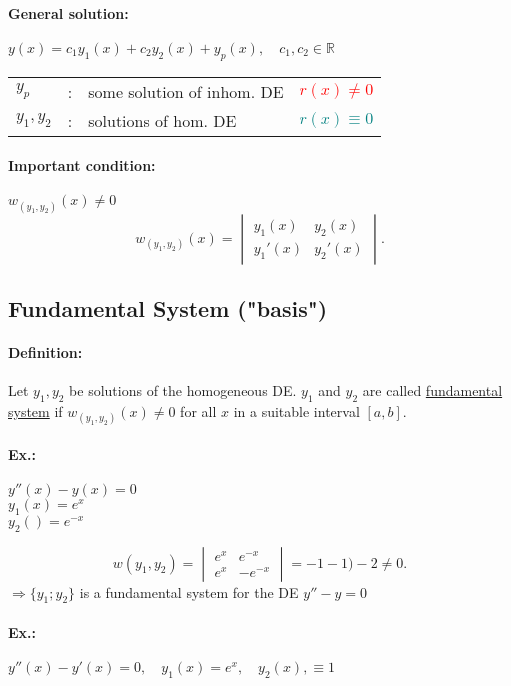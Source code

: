 \documentclass[]{article}
\begin{document}
\paragraph{General solution:} $y(x)=c_1y_1(x)+c_2y_2(x)+y_p(x),\quad c_1,c_2\in \mathbb R$\\
\begin{tabular}{l c l l}
	$y_p$ & : & some solution of inhom. DE & \textcolor{red}{$r(x)\not=0$}\\
	$y_1,y_2$ & : &solutions of hom. DE & \textcolor{teal}{$r(x)\equiv 0$}\\
\end{tabular}
\paragraph{Important condition:} $w_{(y_1,y_2)}(x)\not=0$
\[
	w_{(y_1,y_2)}(x)=
	\begin{vmatrix}
		y_1(x) & y_2(x) \\
		y_1'(x) & y_2'(x)
	\end{vmatrix}
.\]
\subsection{Fundamental System ("basis")}
\paragraph{Definition:} Let $y_1,y_2$ be solutions of the homogeneous DE. $y_1$ and $y_2$ are called \underline{fundamental system} if $w_{(y_1,y_2)}(x)\not=0$ for all $x$ in a suitable interval $[a,b]$.
\paragraph{Ex.:} 
\begin{multicols}{2}
$y''(x)-y(x)=0$\\
$y_1(x)=e ^{x}$\\
$y_2()= e ^{-x}$
\begin{center}
\end{center}
\end{multicols}
\[
w(y_1,y_2)= \begin{vmatrix}
	e ^{x} & e ^{-x}\\ e ^{x} & -e ^{-x}
\end{vmatrix} = -1-1)-2\not=0
.\]
$\Rightarrow \{y_1;y_2\}$ is a fundamental system for the DE $y''-y=0$
\paragraph{Ex.:} $y''(x)-y'(x)=0,\quad y_1(x)=e ^{x},\quad y_2(x),\equiv 1$
\end{document}
